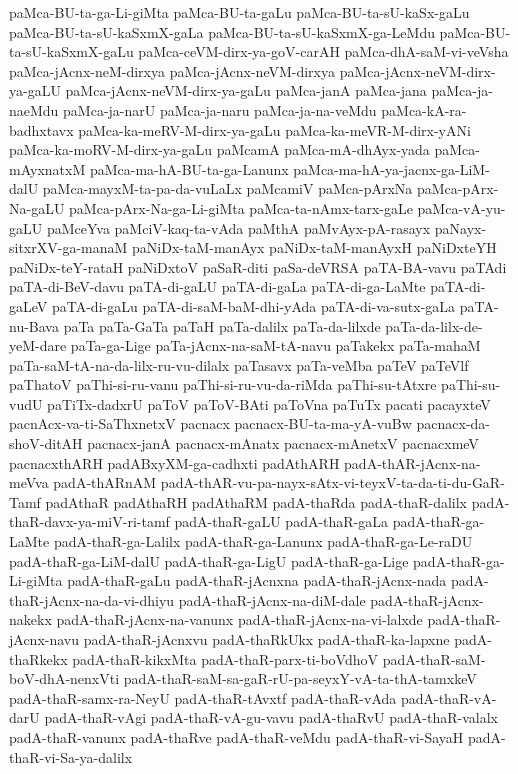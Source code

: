 {paMca-BU-ta-ga-Li-giMta
paMca-BU-ta-gaLu
paMca-BU-ta-sU-kaSx-gaLu
paMca-BU-ta-sU-kaSxmX-gaLa
paMca-BU-ta-sU-kaSxmX-ga-LeMdu
paMca-BU-ta-sU-kaSxmX-gaLu
paMca-ceVM-dirx-ya-goV-carAH
paMca-dhA-saM-vi-veVsha
paMca-jAcnx-neM-dirxya
paMca-jAcnx-neVM-dirxya
paMca-jAcnx-neVM-dirx-ya-gaLU
paMca-jAcnx-neVM-dirx-ya-gaLu
paMca-janA
paMca-jana
paMca-ja-naeMdu
paMca-ja-narU
paMca-ja-naru
paMca-ja-na-veMdu
paMca-kA-ra-badhxtavx
paMca-ka-meRV-M-dirx-ya-gaLu
paMca-ka-meVR-M-dirx-yANi
paMca-ka-moRV-M-dirx-ya-gaLu
paMcamA
paMca-mA-dhAyx-yada
paMca-mAyxnatxM
paMca-ma-hA-BU-ta-ga-Lanunx
paMca-ma-hA-ya-jacnx-ga-LiM-dalU
paMca-mayxM-ta-pa-da-vuLaLx
paMcamiV
paMca-pArxNa
paMca-pArx-Na-gaLU
paMca-pArx-Na-ga-Li-giMta
paMca-ta-nAmx-tarx-gaLe
paMca-vA-yu-gaLU
paMceYva
paMciV-kaq-ta-vAda
paMthA
paMvAyx-pA-rasayx
paNayx-sitxrXV-ga-manaM
paNiDx-taM-manAyx
paNiDx-taM-manAyxH
paNiDxteYH
paNiDx-teY-rataH
paNiDxtoV
paSaR-diti
paSa-deVRSA
paTA-BA-vavu
paTAdi
paTA-di-BeV-davu
paTA-di-gaLU
paTA-di-gaLa
paTA-di-ga-LaMte
paTA-di-gaLeV
paTA-di-gaLu
paTA-di-saM-baM-dhi-yAda
paTA-di-va-sutx-gaLa
paTA-nu-Bava
paTa
paTa-GaTa
paTaH
paTa-dalilx
paTa-da-lilxde
paTa-da-lilx-de-yeM-dare
paTa-ga-Lige
paTa-jAcnx-na-saM-tA-navu
paTakekx
paTa-mahaM
paTa-saM-tA-na-da-lilx-ru-vu-dilalx
paTasavx
paTa-veMba
paTeV
paTeVlf
paThatoV
paThi-si-ru-vanu
paThi-si-ru-vu-da-riMda
paThi-su-tAtxre
paThi-su-vudU
paTiTx-dadxrU
paToV
paToV-BAti
paToVna
paTuTx
pacati
pacayxteV
pacnAcx-va-ti-SaThxnetxV
pacnacx
pacnacx-BU-ta-ma-yA-vuBw
pacnacx-da-shoV-ditAH
pacnacx-janA
pacnacx-mAnatx
pacnacx-mAnetxV
pacnacxmeV
pacnacxthARH
padABxyXM-ga-cadhxti
padAthARH
padA-thAR-jAcnx-na-meVva
padA-thARnAM
padA-thAR-vu-pa-nayx-sAtx-vi-teyxV-ta-da-ti-du-GaR-Tamf
padAthaR
padAthaRH
padAthaRM
padA-thaRda
padA-thaR-dalilx
padA-thaR-davx-ya-miV-ri-tamf
padA-thaR-gaLU
padA-thaR-gaLa
padA-thaR-ga-LaMte
padA-thaR-ga-Lalilx
padA-thaR-ga-Lanunx
padA-thaR-ga-Le-raDU
padA-thaR-ga-LiM-dalU
padA-thaR-ga-LigU
padA-thaR-ga-Lige
padA-thaR-ga-Li-giMta
padA-thaR-gaLu
padA-thaR-jAcnxna
padA-thaR-jAcnx-nada
padA-thaR-jAcnx-na-da-vi-dhiyu
padA-thaR-jAcnx-na-diM-dale
padA-thaR-jAcnx-nakekx
padA-thaR-jAcnx-na-vanunx
padA-thaR-jAcnx-na-vi-lalxde
padA-thaR-jAcnx-navu
padA-thaR-jAcnxvu
padA-thaRkUkx
padA-thaR-ka-lapxne
padA-thaRkekx
padA-thaR-kikxMta
padA-thaR-parx-ti-boVdhoV
padA-thaR-saM-boV-dhA-nenxVti
padA-thaR-saM-sa-gaR-rU-pa-seyxY-vA-ta-thA-tamxkeV
padA-thaR-samx-ra-NeyU
padA-thaR-tAvxtf
padA-thaR-vAda
padA-thaR-vA-darU
padA-thaR-vAgi
padA-thaR-vA-gu-vavu
padA-thaRvU
padA-thaR-valalx
padA-thaR-vanunx
padA-thaRve
padA-thaR-veMdu
padA-thaR-vi-SayaH
padA-thaR-vi-Sa-ya-dalilx
}
